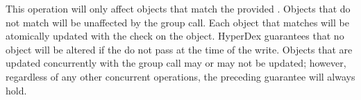 This operation will only affect objects that match the provided .
Objects that do not match  will be unaffected by the group call.
Each object that matches  will be atomically updated with the check
on the object.  HyperDex guarantees that no object will be altered if the
 do not pass at the time of the write.  Objects that are updated
concurrently with the group call may or may not be updated; however, regardless
of any other concurrent operations, the preceding guarantee will always hold.

